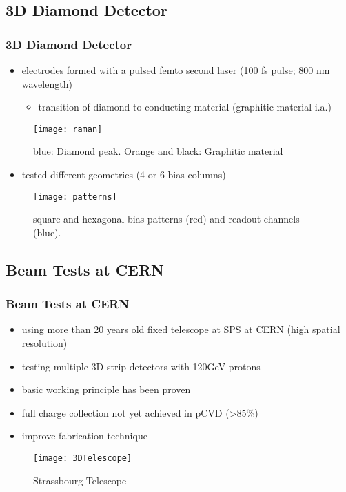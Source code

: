\subsection{3D Diamond Detector}
\begin{frame}
  \frametitle{3D Diamond Detector}
  \begin{minipage}[c]{0.5\textwidth}
    \begin{itemize}
      \item electrodes formed with a pulsed femto second laser (100 fs pulse; 800 nm wavelength)
      \begin{itemize}
	\item transition of diamond to conducting material (graphitic material i.a.)
      \end{itemize}
    \end{itemize}
    \begin{figure}
      \centering
      \texttt{[image: raman]}
      \caption{blue: Diamond peak. Orange and black: Graphitic material}
    \end{figure}
  \end{minipage}
  \begin{minipage}{0.45\textwidth}
    \begin{itemize}
      \item tested different geometries (4 or 6 bias columns)
    \end{itemize}
    \begin{figure}
      \centering
      \texttt{[image: patterns]}
      \caption{square and hexagonal bias patterns (red) and readout channels (blue).}
    \end{figure}
  \end{minipage}
\end{frame}

\subsection{Beam Tests at CERN}
\begin{frame}
	\frametitle{Beam Tests at CERN}
	\begin{itemize}
		\setlength{\itemsep}{\fill}
		\item using more than 20 years old fixed telescope at SPS at CERN (high spatial resolution)
		\item testing multiple 3D strip detectors with 120GeV protons
		\item basic working principle has been proven
		\item full charge collection not yet achieved in pCVD (>85\%)
		\item improve fabrication technique
	\end{itemize}
	\begin{figure}
		\centering
		\texttt{[image: 3DTelescope]}
		\caption{Strassbourg Telescope}
	\end{figure}
\end{frame}
